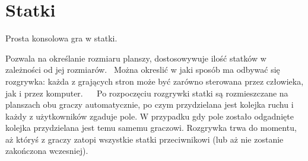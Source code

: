 \chapter{Statki}
\hypertarget{index}{}\label{index}
\label{index_md_strona__glowna}%
%
 Prosta konsolowa gra w statki.

Pozwala na określanie rozmiaru planszy, dostosowywuje ilość statków w zależności od jej rozmiarów.~\newline
Można okreslić w jaki sposób ma odbywać się rozgrywka\+: każda z grających stron może być zarówno sterowana przez człowieka, jak i przez komputer.~\newline
~\newline
 Po rozpoczęciu rozgrywki statki są rozmieszczane na planszach obu graczy automatycznie, po czym przydzielana jest kolejka ruchu i każdy z użytkowników zgaduje pole. W przypadku gdy pole zostało odgadnięte kolejka przydzielana jest temu samemu graczowi. Rozgrywka trwa do momentu, aż któryś z graczy zatopi wszystkie statki przeciwnikowi (lub aż nie zostanie zakończona wczesniej). 